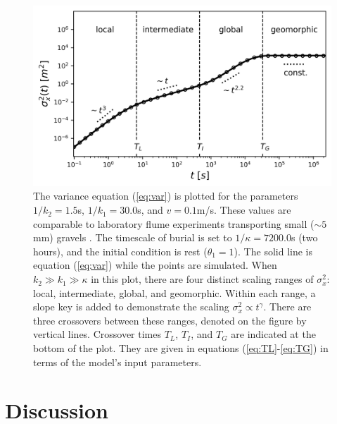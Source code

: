 \documentclass[draft,grl]{agujournal2018}
\begin{document}
\begin{figure}[t]	
	\includegraphics[width=\linewidth,keepaspectratio]{./figures/diffusion.png}
	\caption{The variance equation (\ref{eq:var}) is plotted for the parameters $1/k_2 = 1.5$s, $1/k_1 = 30.0$s, and $v=0.1$m/s. These values are comparable to laboratory flume experiments transporting small ($\sim 5$mm) gravels \citep[cf.,][]{Lajeunesse2010,Martin2012}. The timescale of burial is set to $1/\kappa = 7200.0$s (two hours), and the initial condition is rest ($\theta_1=1$). The solid line is equation (\ref{eq:var}) while the points are  simulated. When $k_2\gg k_1 \gg \kappa$ in this plot, there are four distinct scaling ranges of $\sigma_x^2$: local, intermediate, global, and geomorphic. Within each range, a slope key is added to demonstrate the scaling $\sigma_x^2 \propto t^\gamma$. There are three crossovers between these ranges, denoted on the figure by vertical lines. Crossover times $T_L$, $T_I$, and $T_G$ are indicated at the bottom of the plot. They are given in equations (\ref{eq:TL}-\ref{eq:TG}) in terms of the model's input parameters. }
	\label{fig:var}
\end{figure}


\section{Discussion}
\label{sec:discussion}
\end{document}
